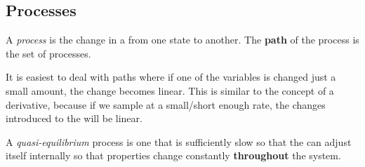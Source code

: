 \subsection{Processes}\label{subsec:Processes}
\begin{definition}[Process]\label{def:Process}
  A \emph{process} is the change in a  from one  state to another.
  The \textbf{path} of the process is the set of  processes.

  It is easiest to deal with paths where if one of the variables is changed just a small amount, the change becomes linear.
  This is similar to the concept of a derivative, because if we sample at a small/short enough rate, the changes introduced to the  will be linear.
\end{definition}

\begin{definition}\label{def:Quasi-equilibrium}
  A \emph{quasi-equilibrium} process is one that is sufficiently slow so that the  can adjust itself internally so that properties change constantly \textbf{throughout} the system.
\end{definition}


